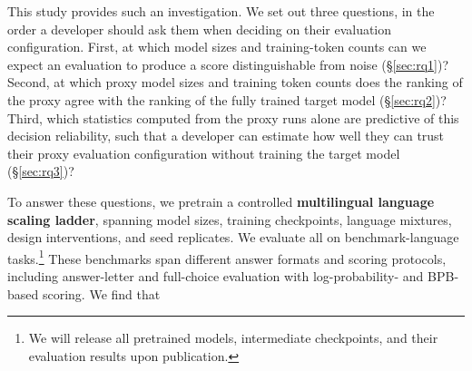 



This study provides such an investigation. We set out three questions, in the order a developer should ask them when deciding on their evaluation configuration.
First, at which model sizes and training-token counts can we expect an evaluation to produce a score distinguishable from noise (\S\ref{sec:rq1})? 
Second, at which proxy model sizes and training token counts does the ranking of the proxy agree with the ranking of the fully trained target model (\S\ref{sec:rq2})?
Third, which statistics computed from the proxy runs alone are predictive of this decision reliability, such that a developer can estimate how well they can trust their proxy evaluation configuration without training the target model (\S\ref{sec:rq3})?

To answer these questions, we pretrain a controlled \textbf{multilingual language scaling ladder}, spanning model sizes, training checkpoints, language mixtures, design interventions, and seed replicates. We evaluate all on \nbenchmarktasks benchmark-language tasks.\footnote{We will release all \nmodels pretrained models, intermediate checkpoints, and their evaluation results upon publication.}
These benchmarks span different answer formats and scoring protocols, including answer-letter and full-choice evaluation with log-probability- and BPB-based scoring. 
We find that  

